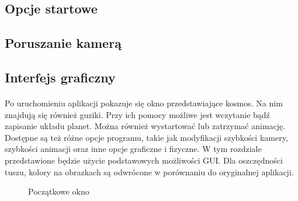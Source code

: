 \subsection{Opcje startowe}\label{sub:uruchamianie programu}
\paragraph{}

\subsection{Poruszanie kamerą}\label{sub:poruszanie kamerą}
\paragraph{}

\subsection{Interfejs graficzny}\label{sub:interfejs graficzny}
\paragraph{}

Po uruchomieniu aplikacji pokazuje się okno przedstawiające kosmos. Na nim znajdują się również guziki. Przy ich pomocy możliwe jest wczytanie bądź zapisanie układu planet. Można również wystartować lub zatrzymać animację. Dostępne są też różne opcje programu, takie jak modyfikacji szybkości kamery, szybkości animacji oraz inne opcje graficzne i fizyczne. W tym rozdziale przedstawione będzie użycie podstawowych możliwości GUI. Dla oszczędności tuszu, kolory na obrazkach są odwrócone w porównaniu do oryginalnej aplikacji.

\begin{figure}[ht!]
\centering
{}
\caption{Początkowe okno}
\label{fig:inst_00}
\end{figure}

